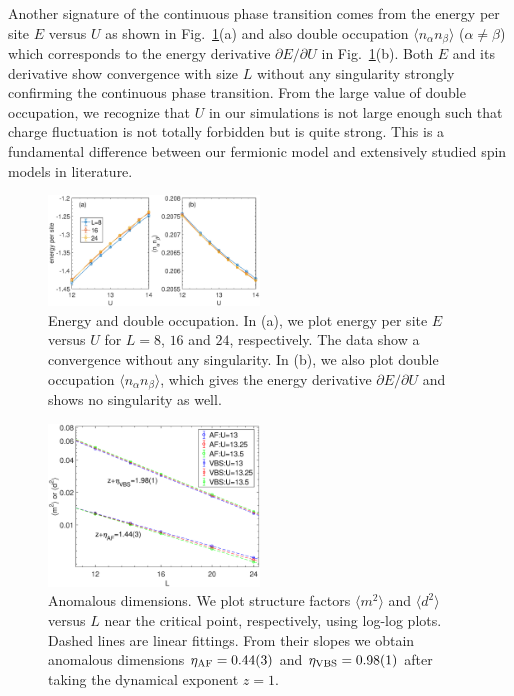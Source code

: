 \documentclass[twocolumn,superscriptaddress]{revtex4-1}
\begin{document}
Another signature of the continuous phase transition comes from the energy per site $E$ versus $U$ as shown in Fig.~\ref{fig:energydoublon}(a) and also double occupation $\langle n_\alpha n_\beta \rangle$ ($\alpha\ne\beta$) which corresponds to the energy derivative $\partial E/\partial U$ in Fig.~\ref{fig:energydoublon}(b). Both $E$ and its derivative show convergence with size $L$ without any singularity strongly confirming the continuous phase transition. From the large value of double occupation, we recognize that $U$ in our simulations is not large enough such that charge fluctuation is not totally forbidden but is quite strong. This is a fundamental difference between our fermionic model and extensively studied spin models in literature.

\begin{figure}
	\includegraphics[width=0.5\textwidth]{energydoublon}
	\caption{\label{fig:energydoublon}Energy and double occupation. In (a), we plot energy per site $E$ versus $U$ for $L=8$, $16$ and $24$, respectively. The data show a convergence without any singularity. In (b), we also plot double occupation $\langle n_\alpha n_\beta \rangle$, which gives the energy derivative $\partial E/\partial U$ and shows no singularity as well.}
\end{figure}

\begin{figure}
  \includegraphics[width=0.5\textwidth]{etaexponent}
  \caption{\label{fig:etaexponent}Anomalous dimensions. We plot structure factors $\langle m^2 \rangle$ and $\langle d^2 \rangle$ versus $L$ near the critical point, respectively, using log-log plots. Dashed lines are linear fittings. From their slopes we obtain anomalous dimensions $\eta_{\rm AF}=0.44(3)$ and $\eta_{\rm VBS}=0.98(1)$ after taking the dynamical exponent $z=1$. }
\end{figure}
\end{document}
